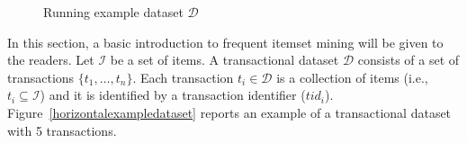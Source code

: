 
\begin{figure}[!t]

{}%
\hfil
{}%

\caption{Running example dataset $\mathcal{D}$}
\label{exampledataset}
\end{figure}
In this section, a basic introduction to frequent itemset mining will
be given to the readers.
Let $\mathcal{I}$ be a set of items. A transactional dataset $\mathcal{D}$
consists of a set of transactions $\{t_1, \dots, t_n\}$.
Each transaction $t_i\in \mathcal{D}$ is a collection of items
(i.e., $t_i\subseteq \mathcal{I}$)
and it is identified by a transaction identifier ($tid_i$).
Figure~\ref{horizontalexampledataset} reports an example of a transactional
dataset with 5 transactions.

